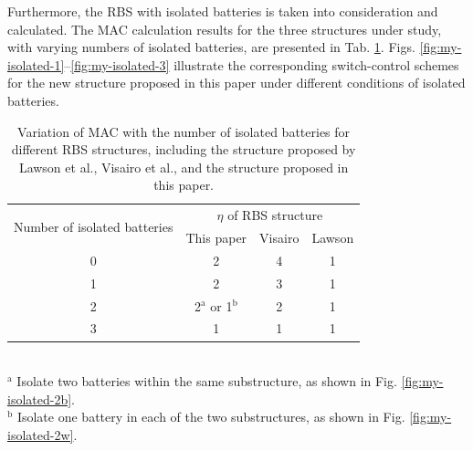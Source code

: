 \documentclass{article}
\begin{document}
Furthermore, the RBS with isolated batteries is taken into consideration and calculated. 
The MAC calculation results for the three structures under study, with varying numbers of isolated batteries, are presented in Tab. \ref{tab:isolated_mac}. 
Figs. \ref{fig:my-isolated-1}--\ref{fig:my-isolated-3} illustrate the corresponding switch-control schemes for the new structure proposed in this paper under different conditions of isolated batteries.

\begin{table}[htbp]
    \centering
    \caption{
      Variation of MAC with the number of isolated batteries for different RBS structures, including the structure proposed by Lawson et al., Visairo et al., and the structure proposed in this paper.
      }
      \label{tab:isolated_mac}
      \begin{tabular}{cccc}
      \toprule
      \multirow{2}[4]{*}{Number of isolated batteries} & \multicolumn{3}{c}{$\eta$ of RBS structure} \\
  \cmidrule{2-4}          & This paper  & Visairo  & Lawson  \\
      \midrule
      0     & 2     & 4     & 1 \\
      1     & 2     & 3     & 1 \\
      2     & 2$^{\mathrm{a}}$ or 1$^{\mathrm{b}}$ & 2     & 1 \\
      3     & 1     & 1     & 1 \\
      \bottomrule
      \end{tabular}
      \\
      \footnotesize{$^{\mathrm{a}}$ Isolate two batteries within the same substructure, as shown in Fig. \ref{fig:my-isolated-2b}.}\\
      \footnotesize{$^{\mathrm{b}}$ Isolate one battery in each of the two substructures, as shown in Fig. \ref{fig:my-isolated-2w}.}
  \end{table}
  
\end{document}
